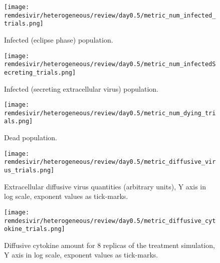 \begin{figure}[H]
\texttt{[image: remdesivir/heterogeneous/review/day0.5/metric\_num\_infected\_trials.png]}
\caption{Infected (eclipse phase) population.\label{fig:app:hetero_regular:day0.5:inf}}
\end{figure}

\begin{figure}[H]
\texttt{[image: remdesivir/heterogeneous/review/day0.5/metric\_num\_infectedSecreting\_trials.png]}
\caption{Infected (secreting extracellular virus) population.\label{fig:app:hetero_regular:day0.5:infSecr}}
\end{figure}

\begin{figure}[H]
\texttt{[image: remdesivir/heterogeneous/review/day0.5/metric\_num\_dying\_trials.png]}
\caption{Dead population.\label{fig:app:hetero_regular:day0.5:dead}}
\end{figure}

\begin{figure}[H]
\texttt{[image: remdesivir/heterogeneous/review/day0.5/metric\_diffusive\_virus\_trials.png]}
\caption{Extracellular diffusive virus quantities (arbitrary units), Y axis in log scale, exponent values as tick-marks.\label{fig:app:hetero_regular:day0.5:diff_vir}}
\end{figure}


\begin{figure}[H]
\texttt{[image: remdesivir/heterogeneous/review/day0.5/metric\_diffusive\_cytokine\_trials.png]}
\caption{Diffusive cytokine amount for 8 replicas of the treatment simulation, Y axis in log scale, exponent values as tick-marks.\label{fig:app:hetero_regular:day0.5:diff_cyto}}
\end{figure}


